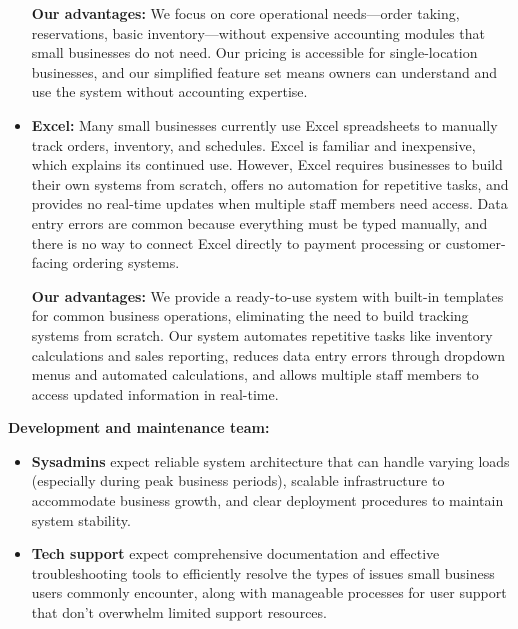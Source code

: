 \documentclass[]{VUMIFTemplateClass}
\begin{document}
\begin{itemize}
    \textbf{Our advantages:} We focus on core operational needs—order taking,
    reservations, basic inventory—without expensive accounting modules that
    small businesses do not need. Our pricing is accessible for single-location
    businesses, and our simplified feature set means owners can understand and
    use the system without accounting expertise.
    
    \item \textbf{Excel:} Many small businesses currently use Excel spreadsheets
    to manually track orders, inventory, and schedules. Excel is familiar and
    inexpensive, which explains its continued use. However, Excel requires
    businesses to build their own systems from scratch, offers no automation for
    repetitive tasks, and provides no real-time updates when multiple staff
    members need access. Data entry errors are common because everything must be
    typed manually, and there is no way to connect Excel directly to payment
    processing or customer-facing ordering systems.
    
    \textbf{Our advantages:} We provide a ready-to-use system with built-in
    templates for common business operations, eliminating the need to build
    tracking systems from scratch. Our system automates repetitive tasks like
    inventory calculations and sales reporting, reduces data entry errors
    through dropdown menus and automated calculations, and allows multiple staff
    members to access updated information in real-time.
\end{itemize}

\textbf{Development and maintenance team:}
\begin{itemize}
    \item \textbf{Sysadmins} expect reliable system architecture that can handle
    varying loads (especially during peak business periods), scalable
    infrastructure to accommodate business growth, and clear deployment
    procedures to maintain system stability.
    \item \textbf{Tech support} expect comprehensive documentation and effective
    troubleshooting tools to efficiently resolve the types of issues small
    business users commonly encounter, along with manageable processes for user
    support that don't overwhelm limited support resources.
\end{itemize}


\end{document}
